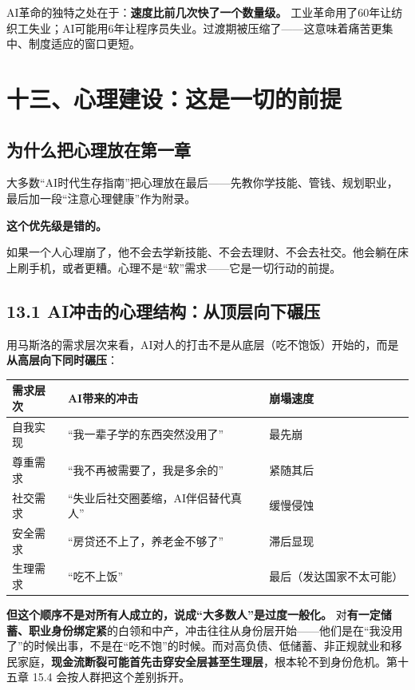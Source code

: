 \documentclass[11pt,a4paper]{ctexart}
\begin{document}
AI革命的独特之处在于：\textbf{速度比前几次快了一个数量级。} 工业革命用了60年让纺织工失业；AI可能用6年让程序员失业。过渡期被压缩了——这意味着痛苦更集中、制度适应的窗口更短。

\section{十三、心理建设：这是一切的前提}

\subsection{为什么把心理放在第一章}

大多数“AI时代生存指南”把心理放在最后——先教你学技能、管钱、规划职业，最后加一段“注意心理健康”作为附录。

\textbf{这个优先级是错的。}

如果一个人心理崩了，他不会去学新技能、不会去理财、不会去社交。他会躺在床上刷手机，或者更糟。心理不是“软”需求——它是一切行动的前提。

\subsection{13.1 AI冲击的心理结构：从顶层向下碾压}

用马斯洛的需求层次来看，AI对人的打击不是从底层（吃不饱饭）开始的，而是\textbf{从高层向下同时碾压}：

\begin{center}

\begin{tabularx}{\textwidth}{lXX}
\toprule
需求层次 & AI带来的冲击 & 崩塌速度 \\
\midrule
自我实现 & “我一辈子学的东西突然没用了” & 最先崩 \\
尊重需求 & “我不再被需要了，我是多余的” & 紧随其后 \\
社交需求 & “失业后社交圈萎缩，AI伴侣替代真人” & 缓慢侵蚀 \\
安全需求 & “房贷还不上了，养老金不够了” & 滞后显现 \\
生理需求 & “吃不上饭” & 最后（发达国家不太可能） \\
\bottomrule
\end{tabularx}
\end{center}

\textbf{但这个顺序不是对所有人成立的，说成“大多数人”是过度一般化。} 对\textbf{有一定储蓄、职业身份绑定紧}的白领和中产，冲击往往从身份层开始——他们是在“我没用了”的时候出事，不是在“吃不饱”的时候。而对高负债、低储蓄、非正规就业和移民家庭，\textbf{现金流断裂可能首先击穿安全层甚至生理层}，根本轮不到身份危机。第十五章 15.4 会按人群把这个差别拆开。
\end{document}

